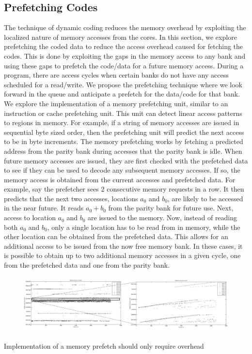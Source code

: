 \subsection{Prefetching Codes}
\label{sec:prefetching}
The technique of dynamic coding reduces the memory overhead by exploiting the 
localized nature of memory accesses from the cores. In this section, we explore 
prefetching the coded data to reduce the access overhead caused for fetching the 
codes. This is done by exploiting the gaps in the memory access to any bank and 
using these gaps to prefetch the code/data for a future memory access. During a 
program, there are access cycles when certain banks do not have any access 
scheduled for a read/write. We propose the prefetching technique where we look 
forward in the queue and anticipate a prefetch for the data/code for that bank.  
We explore the implementation of a memory prefetching unit, similar to an 
instruction or cache prefetching unit. This unit can detect linear access 
patterns to regions in memory.  For example, if a string of memory accesses are 
issued in sequential byte sized order, then the prefetching unit will predict 
the next access to be in byte increments. The memory prefetching works by 
fetching a predicted address from the parity bank during accesses that the 
parity bank is idle. When future memory accesses are issued, they are first 
checked with the prefetched data to see if they can be used to decode any 
subsequent memory accesses. If so, the memory access is obtained from the 
current accesses and prefetched data. For example, say the prefetcher sees 2 
consecutive memory requests in a row. It then predicts that the next two 
accesses, locations $a_0$ and $b_0$, are likely to be accessed in the near 
future. It reads $a_0+b_0$ from the parity bank for future use. Next, access to 
location $a_0$ and $b_0$ are issued to the memory. Now, instead of reading both 
$a_0$ and $b_0$, only a single location has to be read from in memory, while the 
other location can be obtained from the prefetched data. This allows for an 
additional access to be issued from the now free memory bank.  In these cases, 
it is possible to obtain up to two additional memory accesses in a given cycle, 
one from the prefetched data and one from the parity bank.
\begin{figure}[htbp]
\centering
\includegraphics[width=0.5\linewidth]{fig/bank_access1.jpg}
\caption{ }
\label{fig:bank_access1}
\end{figure} Implementation of a memory prefetch should only require overhead 
